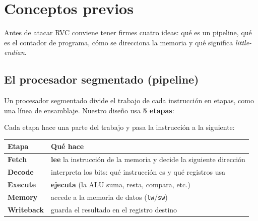 \documentclass[11pt]{article}
\newcommand{\code}[1]{\texttt{#1}}
\begin{document}
\section{Conceptos previos}

Antes de atacar RVC conviene tener firmes cuatro ideas: qué es un pipeline, qué
es el contador de programa, cómo se direcciona la memoria y qué significa
\emph{little-endian}.

\subsection{El procesador segmentado (pipeline)}

Un procesador segmentado divide el trabajo de cada instrucción en etapas, como
una línea de ensamblaje. Nuestro diseño usa \textbf{5 etapas}:

\begin{center}
\end{center}

\noindent
Cada etapa hace una parte del trabajo y pasa la instrucción a la siguiente:

\begin{center}
\begin{tabular}{@{}ll@{}}
\toprule
\textbf{Etapa} & \textbf{Qué hace} \\
\midrule
\textbf{Fetch}     & \textbf{lee} la instrucción de la memoria y decide la siguiente dirección \\
\textbf{Decode}    & interpreta los bits: qué instrucción es y qué registros usa \\
\textbf{Execute}   & \textbf{ejecuta} (la ALU suma, resta, compara, etc.) \\
\textbf{Memory}    & accede a la memoria de datos (\code{lw}/\code{sw}) \\
\textbf{Writeback} & guarda el resultado en el registro destino \\
\bottomrule
\end{tabular}
\end{center}
\end{document}
